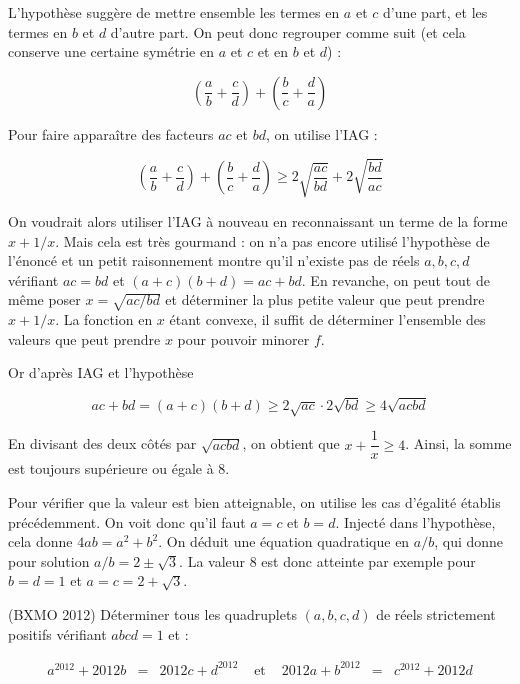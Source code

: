 \begin{sol}
L'hypothèse suggère de mettre ensemble les termes en $a$ et $c$ d'une part, et les termes en $b$ et $d$ d'autre part. On peut donc regrouper comme suit (et cela conserve une certaine symétrie en $a$ et $c$ et en $b$ et $d$) : 

\[\left(\frac{a}{b} +\frac{c}{d}\right) + \left(\frac{b}{c}+\frac{d}{a}\right)\]

Pour faire apparaître des facteurs $ac$ et $bd$, on utilise l'IAG : 

 \[\left(\frac{a}{b} +\frac{c}{d}\right) + \left(\frac{b}{c}+\frac{d}{a}\right) \geqslant 2\sqrt{\frac{ac}{bd}}+ 2 \sqrt{\frac{bd}{ac}}\]
 
 On voudrait alors utiliser l'IAG à nouveau en reconnaissant un terme de la forme $x+1/x$. Mais cela est très gourmand : on n'a pas encore utilisé l'hypothèse de l'énoncé et un petit raisonnement montre qu'il n'existe pas de réels $a,b,c,d$ vérifiant $ac=bd$ et $(a+c)(b+d)=ac+bd$. En revanche, on peut tout de même poser $x=\sqrt{ac/bd}$ et déterminer la plus petite valeur que peut prendre $x+1/x$. La fonction en $x$ étant convexe, il suffit de déterminer l'ensemble des valeurs que peut prendre $x$ pour pouvoir minorer $f$. 

\medskip

Or d'après IAG et l'hypothèse 

\[ac+bd= (a+c)(b+d) \geqslant 2\sqrt{ac}\cdot 2 \sqrt{bd} \geqslant 4 \sqrt{acbd}\]

En divisant des deux côtés par $\sqrt{acbd}$, on obtient que $x+\dfrac1{x} \geqslant 4$. Ainsi, la somme est toujours supérieure ou égale à $8$. 

\medskip

Pour vérifier que la valeur est bien atteignable, on utilise les cas d'égalité établis précédemment. On voit donc qu'il faut $a=c$ et $b=d$. Injecté dans l'hypothèse, cela donne $4ab=a^2+b^2$. On déduit une équation quadratique en $a/b$, qui donne pour solution $a/b= 2\pm \sqrt{3}$. La valeur $8$ est donc atteinte par exemple pour $b=d=1$ et $a=c=2+\sqrt{3}$. 
\end{sol}


\begin{exo}
(BXMO 2012)
Déterminer tous les quadruplets $(a,b,c,d)$ de réels strictement positifs vérifiant $abcd=1$ et :

\[\begin{array}{lllllll}
a^{2012}+2012b &=& 2012c+d^{2012} &\text{ et } & 2012a+b^{2012} &=& c^{2012}+2012d\\
\end{array}\]
\end{exo}

